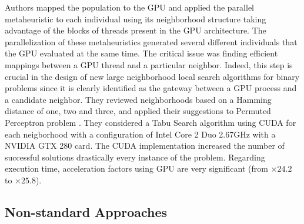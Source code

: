\documentclass[review]{elsarticle}
\begin{document}
Authors mapped the population to the GPU and applied the parallel metaheuristic to each individual using its neighborhood structure taking advantage of the blocks of threads present in the GPU architecture. The parallelization of these metaheuristics generated several different individuals that the GPU evaluated at the same time. The critical issue was finding efficient mappings between a GPU thread and a particular neighbor. Indeed, this step is crucial in the design of new large neighborhood local search algorithms for binary problems since it is clearly identified as the gateway between a GPU process and a candidate neighbor. They reviewed neighborhoods based on a Hamming distance of one, two and three, and applied their suggestions to Permuted Perceptron problem \cite{KnudsenPermutedPerceptronProblem1999}. They considered a Tabu Search algorithm \cite{TaillardTabySearch1991} using CUDA for each neigborhood with a configuration of Intel Core 2 Duo 2.67GHz with a NVIDIA GTX 280 card. The CUDA implementation increased the number of successful solutions drastically every instance of the problem. Regarding execution time, acceleration factors using GPU are very significant (from $\times24.2$ to $\times25.8$).


\subsection{Non-standard Approaches}
\end{document}
